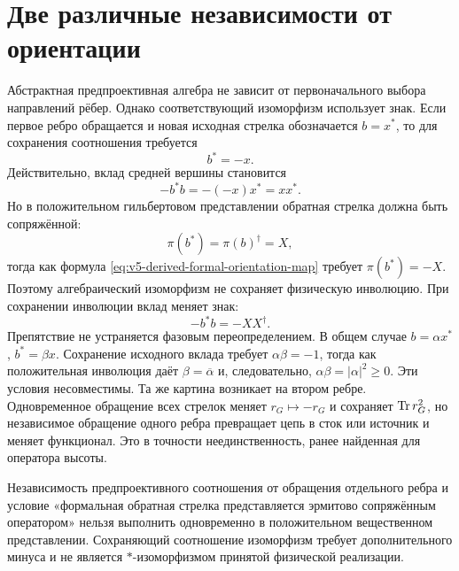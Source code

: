 \section{Две различные независимости от ориентации}

Абстрактная предпроективная алгебра не зависит от первоначального выбора
направлений рёбер. Однако соответствующий изоморфизм использует знак.
Если первое ребро обращается и новая исходная стрелка обозначается
\(b=x^*\), то для сохранения соотношения требуется
\begin{equation}
 b^*=-x.
 \label{eq:v5-derived-formal-orientation-map}
\end{equation}
Действительно, вклад средней вершины становится
\begin{equation}
 -b^*b=-(-x)x^*=xx^*.
\end{equation}
Но в положительном гильбертовом представлении обратная стрелка должна быть
сопряжённой:
\begin{equation}
 \pi(b^*)=\pi(b)^\dagger=X,
\end{equation}
тогда как формула \eqref{eq:v5-derived-formal-orientation-map} требует
\(\pi(b^*)=-X\). Поэтому алгебраический изоморфизм не сохраняет физическую
инволюцию. При сохранении инволюции вклад меняет знак:
\begin{equation}
 -b^*b=-XX^\dagger.
\end{equation}
Препятствие не устраняется фазовым переопределением. В общем случае
\(b=\alpha x^*\), \(b^*=\beta x\). Сохранение исходного вклада требует
\(\alpha\beta=-1\), тогда как положительная инволюция даёт
\(\beta=\overline{\alpha}\) и, следовательно,
\(\alpha\beta=|\alpha|^2\geq0\). Эти условия несовместимы.
Та же картина возникает на втором ребре. Одновременное обращение всех
стрелок меняет \(r_G\mapsto-r_G\) и сохраняет \(\operatorname{Tr} r_G^2\), но независимое
обращение одного ребра превращает цепь в сток или источник и меняет
функционал. Это в точности неединственность, ранее найденная для оператора
высоты.

\begin{theorem}
Независимость предпроективного соотношения от обращения отдельного ребра и
условие «формальная обратная стрелка представляется эрмитово сопряжённым
оператором» нельзя выполнить одновременно в положительном вещественном
представлении. Сохраняющий соотношение изоморфизм требует дополнительного
минуса и не является \(*\)-изоморфизмом принятой физической реализации.
\end{theorem}

